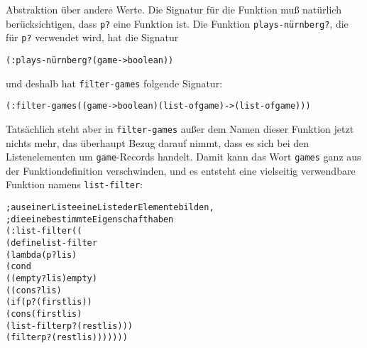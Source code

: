 Abstraktion über andere Werte.  Die Signatur für die Funktion muß
natürlich berücksichtigen, dass \texttt{p?} eine Funktion ist.  Die Funktion
\texttt{plays-nürnberg?}, die für \texttt{p?}  verwendet wird, hat die
Signatur
%
\begin{alltt}
(: plays-nürnberg? (game -> boolean))
\end{alltt}
%
und deshalb hat \texttt{filter-games} folgende Signatur:
%
\begin{alltt}
(: filter-games ((game -> boolean) (list-of game) -> (list-of game)))
\end{alltt}
%
Tatsächlich steht aber in \texttt{filter-games} außer dem Namen dieser Funktion
jetzt nichts mehr, das
überhaupt Bezug darauf nimmt, dass es sich bei den Listenelementen um
\texttt{game}-Records handelt.  %
Damit kann das Wort \texttt{games} ganz aus der Funktiondefinition
verschwinden, und es entsteht eine vielseitig verwendbare Funktion
namens \texttt{list-filter}:
%
\begin{alltt}
; aus einer Liste eine Liste der Elemente bilden,
; die eine bestimmte Eigenschaft haben
(: list-filter ((%a -> boolean) (list-of %a) -> (list-of %a)))
(define list-filter
  (lambda (p? lis)
    (cond
      ((empty? lis) empty)
      ((cons? lis)
       (if (p? (first lis))
           (cons (first lis)
                      (list-filter p? (rest lis)))
           (filter p? (rest lis)))))))
\end{alltt}


